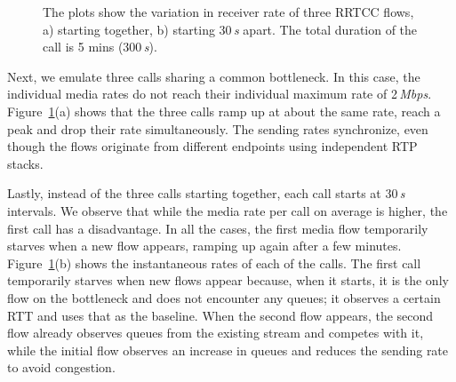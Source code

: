 \begin{figure}[!t]
\centerline{
  }
  \centerline{
  }
   \caption{The plots show the variation in receiver rate of three RRTCC
   flows, a) starting together, b) starting 30\,\emph{s} apart. The total duration of
   the call is 5 mins (300\,\emph{s}).}
\label{fig:rrtcc-self-fair}
\end{figure}

\begin{table}[!t]
\begin{center}
\end{center}
    \caption{RRTCC competing with similar cross-traffic on the bottleneck link.}
    \label{tab:self-fair}
\end{table}

Next, we emulate three calls sharing a common bottleneck. In this case, the
individual media rates do not reach their individual maximum rate of 2\,\emph{Mbps}.
Figure~\ref{fig:rrtcc-self-fair}(a) shows that the three calls ramp up at about the
same rate, reach a peak and drop their rate simultaneously. The sending rates
synchronize, even though the flows originate from different endpoints using
independent RTP stacks.

Lastly, instead of the three calls starting together, each call starts at 30\,\emph{s}
intervals. We observe that while the media rate per call on average is higher,
the first call has a disadvantage. In all the cases, the first media flow temporarily 
starves when a new flow appears, ramping up again after a few minutes.
Figure~\ref{fig:rrtcc-self-fair}(b) shows the instantaneous rates of each of
the calls. The first call temporarily starves when new flows appear because,
when it starts, it is the only flow on the bottleneck and does not encounter
any queues; it observes a certain RTT and uses that as the baseline. When the
second flow appears, the second flow already observes queues from the existing
stream and competes with it, while the initial flow observes an increase in
queues and reduces the sending rate to avoid congestion.


